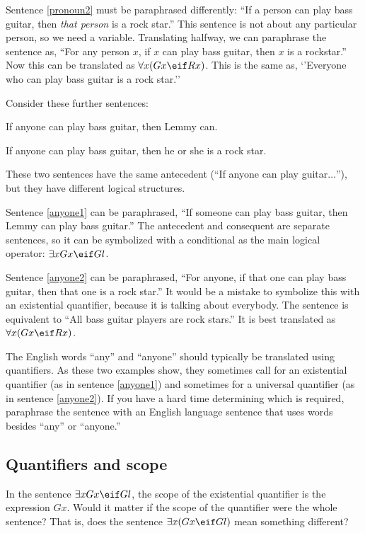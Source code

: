 Sentence \ref{pronoun2} must be paraphrased differently: ``If a person can play bass guitar, then \emph{that person} is a rock star.'' This sentence is not about any particular person, so we need a variable. Translating halfway, we can paraphrase the sentence as, ``For any person $x$, if $x$ can play bass guitar, then $x$ is a rockstar.'' Now this can be translated as $\forall x (Gx \eif Rx)$. This is the same as, `'Everyone who can play bass guitar is a rock star.''


Consider these further sentences:

\begin{kormanize}
\item[\ex{anyone1}] If anyone can play bass guitar, then Lemmy can.
\item[\ex{anyone2}] If anyone can play bass guitar, then he or she is a rock star.
\end{kormanize}

These two sentences have the same antecedent (``If anyone can play guitar$\ldots$''), but they have different logical structures.

Sentence \ref{anyone1} can be paraphrased, ``If someone can play bass guitar, then Lemmy can play bass guitar.'' The antecedent and consequent are separate sentences, so it can be symbolized with a conditional as the main logical operator: $\exists x Gx \eif Gl$.

Sentence \ref{anyone2} can be paraphrased, ``For anyone, if that one can play bass guitar, then that one is a rock star.'' It would be a mistake to symbolize this with an existential quantifier, because it is talking about everybody. The sentence is equivalent to ``All bass guitar players are rock stars.'' It is best translated as $\forall x(Gx \eif Rx)$.

The English words ``any'' and ``anyone'' should typically be translated using quantifiers. As these two examples show, they sometimes call for an existential quantifier (as in sentence \ref{anyone1}) and sometimes for a universal quantifier (as in sentence \ref{anyone2}). If you have a hard time determining which is required, paraphrase the sentence with an English language sentence that uses words besides ``any'' or ``anyone.''

\subsection{Quantifiers and scope}
In the sentence $\exists x Gx \eif Gl$, the scope of the existential quantifier is the expression $Gx$. Would it matter if the scope of the quantifier were the whole sentence? That is, does the sentence $\exists x (Gx \eif Gl)$ mean something different?

